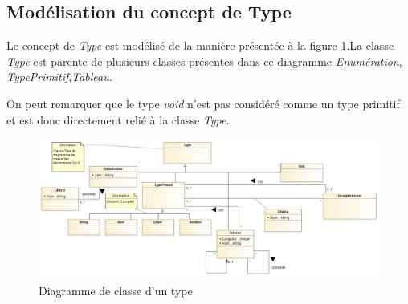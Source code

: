 
\subsection{Modélisation du concept de Type}
\label{sec:question8}

Le concept de \emph{Type} est modélisé de la manière présentée à la figure \ref{fig:type}.La classe \emph{Type} est parente de plusieurs classes présentes dans ce diagramme \emph{Enumération}, \emph{TypePrimitif},\emph{Tableau}. 

On peut remarquer que le type \emph{void} n'est pas considéré comme un type primitif et est donc directement relié à la classe \emph{Type}. 

\begin{figure}[h!]
	\centering
	\includegraphics[width=450pt]{assets/class__Type}
	\caption{Diagramme de classe d'un type}
	\label{fig:type}
\end{figure}
